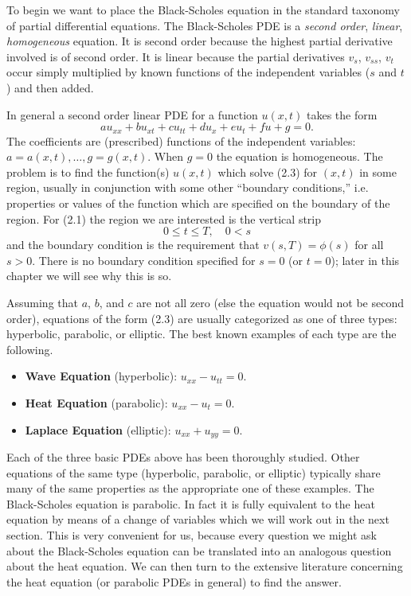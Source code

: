 To begin we want to place the Black-Scholes equation in the standard taxonomy of partial differential equations. The Black-Scholes PDE is a \textit{second order}, \textit{linear}, \textit{homogeneous} equation. It is second order because the highest partial derivative involved is of second order. It is linear because the partial derivatives \(v_s\), \(v_{ss}\), \(v_t\) occur simply multiplied by known functions of the independent variables (\(s\) and \(t\)) and then added.

In general a second order linear PDE for a function \(u(x,t)\) takes the form
\[
a u_{xx} + b u_{xt} + c u_{tt} + d u_x + e u_t + f u + g = 0. \tag{2.3}
\]
The coefficients are (prescribed) functions of the independent variables: \(a = a(x,t),\dots,g = g(x,t)\). When \(g = 0\) the equation is homogeneous. The problem is to find the function(s) \(u(x,t)\) which solve (2.3) for \((x,t)\) in some region, usually in conjunction with some other ``boundary conditions,'' i.e. properties or values of the function which are specified on the boundary of the region. For (2.1) the region we are interested is the vertical strip
\[
0 \leq t \leq T, \quad 0 < s
\]
and the boundary condition is the requirement that \(v(s,T) = \phi(s)\) for all \(s > 0\). There is no boundary condition specified for \(s = 0\) (or \(t = 0\)); later in this chapter we will see why this is so.

Assuming that \(a\), \(b\), and \(c\) are not all zero (else the equation would not be second order), equations of the form (2.3) are usually categorized as one of three types: hyperbolic, parabolic, or elliptic. The best known examples of each type are the following.

\begin{itemize}
    \item \textbf{Wave Equation} (hyperbolic): \(u_{xx} - u_{tt} = 0\).
    \item \textbf{Heat Equation} (parabolic): \(u_{xx} - u_t = 0\).
    \item \textbf{Laplace Equation} (elliptic): \(u_{xx} + u_{yy} = 0\).
\end{itemize}

Each of the three basic PDEs above has been thoroughly studied. Other equations of the same type (hyperbolic, parabolic, or elliptic) typically share many of the same properties as the appropriate one of these examples. The Black-Scholes equation is parabolic. In fact it is fully equivalent to the heat equation by means of a change of variables which we will work out in the next section. This is very convenient for us, because every question we might ask about the Black-Scholes equation can be translated into an analogous question about the heat equation. We can then turn to the extensive literature concerning the heat equation (or parabolic PDEs in general) to find the answer.


